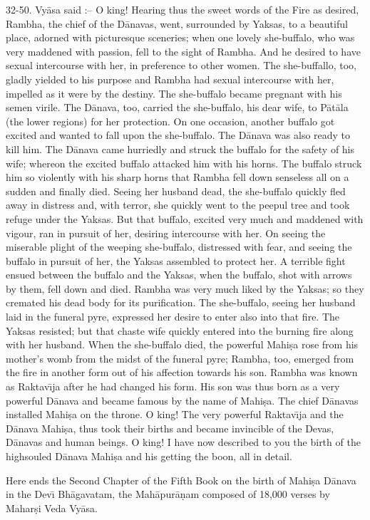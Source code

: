 32-50. Vy\=asa said :-- O king! Hearing thus the sweet words of the Fire as desired, Rambha, the chief of the D\=anavas, went, surrounded by Yaksas, to a beautiful place, adorned with picturesque sceneries; when one lovely she-buffalo, who was very maddened with passion, fell to the sight of Rambha. And he desired to have sexual intercourse with her, in preference to other women. The she-buffallo, too, gladly yielded to his purpose and Rambha had sexual intercourse with her, impelled as it were by the destiny. The she-buffalo became pregnant with his semen virile. The D\=anava, too, carried the she-buffalo, his dear wife, to P\=at\=ala (the lower regions) for her protection. On one occasion, another buffalo got excited and wanted to fall upon the she-buffalo. The D\=anava was also ready to kill him. The D\=anava came hurriedly and struck the buffalo for the safety of his wife; whereon the excited buffalo attacked him with his horns. The buffalo struck him so violently with his sharp horns that Rambha fell down senseless all on a sudden and finally died. Seeing her husband dead, the she-buffalo quickly fled away in distress and, with terror, she quickly went to the peepul tree and took refuge under the Yaksas. But that buffalo, excited very much and maddened with vigour, ran in pursuit of her, desiring intercourse with her. On seeing the miserable plight of the weeping she-buffalo, distressed with fear, and seeing the buffalo in pursuit of her, the Yaksas assembled to protect her. A terrible fight ensued between the buffalo and the Yaksas, when the buffalo, shot with arrows by them, fell down and died. Rambha was very much liked by the Yaksas; so they cremated his dead body for its purification. The she-buffalo, seeing her husband laid in the funeral pyre, expressed her desire to enter also into that fire. The Yaksas resisted; but that chaste wife quickly entered into the burning fire along with her husband. When the she-buffalo died, the powerful Mahi\d{s}a rose from his mother's womb from the midst of the funeral pyre; Rambha, too, emerged from the fire in another form out of his affection towards his son. Rambha was known as Raktav\={\i}ja after he had changed his form. His son was thus born as a very powerful D\=anava and became famous by the name of Mahi\d{s}a. The chief D\=anavas installed Mahi\d{s}a on the throne. O king! The very powerful Raktav\={\i}ja and the D\=anava Mahi\d{s}a, thus took their births and became invincible of the Devas, D\=anavas and human beings. O king! I have now described to you the birth of the highsouled D\=anava Mahi\d{s}a and his getting the boon, all in detail.

Here ends the Second Chapter of the Fifth Book on the birth of Mahi\d{s}a D\=anava in the Dev\={\i} Bh\=agavatam, the Mah\=apur\=a\d{n}am composed of 18,000 verses by Mahar\d{s}i Veda Vy\=asa.




